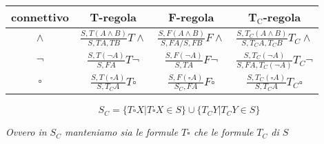 \documentclass[a4paper,12pt, oneside]{book}
\begin{document}
\begin{table}[H]
  \Large
  \centering
  \begin{tabular}{c||c|c|c}
    connettivo& T-regola& F-regola&T$_{\mbox{C}}$-regola\\
    \hline
    \hline
    $\land$ & $\frac{S,T(A\land B)}{S,TA,TB}T\land$&
              $\frac{S,F(A\land B)}{S,FA/S,FB}F\land$&
              $\frac{S,T_C(A\land B)}{S,T_CA,T_CB}T_C\land$\\
    \hline
    $\neg$ & $\frac{S,T(\neg A)}{S,FA}T\neg$&
             $\frac{S,F(\neg A)}{S,TA}F\neg$&
             $\frac{S,T_C(\neg A)}{S,FA,T_C(\neg A)}T_C\neg$\\
    \hline
    $\square$ & $\frac{S,T(\square A)}{S,T_CA}T\square$&
                $\frac{S,F(\square A)}{S_C,FA}F\square$&
                $\frac{S,T_C(\square A)}{S,T_CA}T_C\square$\\
  \end{tabular}
\end{table}
\[S_C=\{T\square X|T\square X\in S\}\cup\{T_CY|T_CY\in S\}\]
\begin{center}
  \textit{Ovvero in $S_C$ manteniamo sia le formule $T\square$ che le formule
    $T_C$ di $S$}
\end{center}
\end{document}
